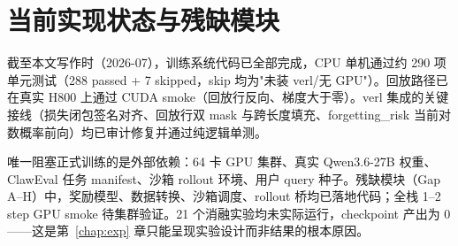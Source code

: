 \section{当前实现状态与残缺模块}
\label{sec:sys-status}

截至本文写作时（2026-07），训练系统代码已全部完成，CPU 单机通过约 290 项单元测试（288 passed + 7 skipped，skip 均为"未装 verl/无 GPU"）。回放路径已在真实 H800 上通过 CUDA smoke（回放行反向、梯度大于零）。verl 集成的关键接线（损失闭包签名对齐、回放行双 mask 与跨长度填充、forgetting\_risk 当前对数概率前向）均已审计修复并通过纯逻辑单测。

唯一阻塞正式训练的是外部依赖：64 卡 GPU 集群、真实 Qwen3.6-27B 权重、ClawEval 任务 manifest、沙箱 rollout 环境、用户 query 种子。残缺模块（Gap A--H）中，奖励模型、数据转换、沙箱调度、rollout 桥均已落地代码；全栈 1--2 step GPU smoke 待集群验证。21 个消融实验均未实际运行，checkpoint 产出为 0——这是第~\ref{chap:exp} 章只能呈现实验设计而非结果的根本原因。
